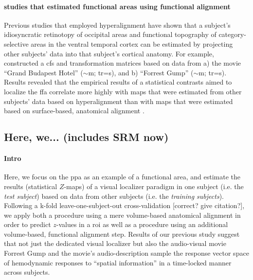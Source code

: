 \paragraph{studies that estimated functional areas using functional alignment}

Previous studies \citep{jiahui2020predicting, guntupalli2016model,
haxby2011common} that employed hyperalignment have shown that a subject's
idiosyncratic retinotopy of occipital areas and functional topography of
category-selective areas in the ventral temporal cortex can be estimated by
projecting other subjects' data into that subject's cortical anatomy.
For example, \citep{jiahui2020predicting} constructed a \ac{cfs}
and transformation matrices based on data from a) the movie ``Grand Budapest
Hotel'' ($\sim$\unit[50]{m}; \ac{tr}=\unit[1]{s}), and b) ``Forrest Gump''
($\sim$\unit[120]{m}; \ac{tr}=\unit[2]{s}).
Results revealed that the empirical results of a statistical contrasts aimed to
localize the \ac{ffa} correlate more highly with maps that were estimated from
other subjects' data based on hyperalignment than with maps that were estimated
based on surface-based, anatomical alignment \citep{jiahui2020predicting}.


\subsection{Here, we... (includes SRM now)}


\paragraph{Intro}

Here, we focus on the \ac{ppa} as an example of a functional area, and estimate
the results (statistical $Z$-maps) of a visual localizer paradigm in one subject
(i.e. the \textit{test subject}) based on data from other subjects (i.e. the
\textit{training subjects}).
%
Following a k-fold leave-one-subject-out cross-validation [correct? give
citation?], we apply both a procedure using a mere volume-based anatomical
alignment in order to predict $z$-values in a \ac{roi} as well as a procedure
using an additional volume-based, functional alignment step.
%
Results of our previous study suggest \citep{haeusler2022processing} that not
just the dedicated visual localizer \citep{sengupta2016extension} but also the
audio-visual movie Forrest Gump \citep{hanke2016simultaneous} and the movie's
audio-description \citep{hanke2014audiomovie} sample the response vector space
of hemodynamic responses to ``spatial information'' in a time-locked manner
across subjects.


